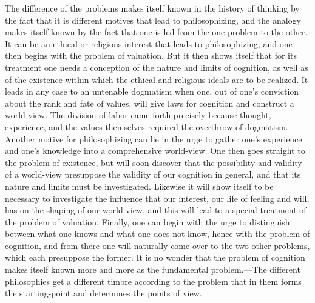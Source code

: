 \documentclass[12pt,a4paper]{book}
\newcommand{\opage}[1]{\marginnote{\footnotesize\textit{[#1]}}}
\begin{document}
The difference of the problems makes itself known in the history of thinking
by the fact that it is different motives that lead to philosophizing, and the
analogy makes itself known by the fact that one is led from the one problem to
the other. It can be an ethical or religious interest that leads to
philosophizing, and one then begins with the problem of valuation. But it then
shows itself that for its treatment one needs a conception of the nature and
limits of cognition, as well as of the existence within which the ethical and
religious ideals are to be realized. It leads in any case to an untenable
dogmatism when one, out of one's conviction about the rank and fate of values,
will give laws for cognition and construct a world-view. The division of labor
came forth precisely because thought, experience, and the values themselves
required the overthrow of dogmatism. Another motive for philosophizing can lie
in the urge to gather one's experience and one's knowledge into a
comprehensive world-view. One then goes straight to the problem of existence,
but will soon discover that the possibility and validity of a world-view
presuppose the validity of our cognition in general, and that its nature and
limits must be investigated. Likewise it will show itself to be necessary to
investigate the influence that our interest, our life of feeling and will, has
on the shaping of our \opage{253}world-view, and this will lead to a special treatment of
the problem of valuation. Finally, one can begin with the urge to distinguish
between what one knows and what one does not know, hence with the problem of
cognition, and from there one will naturally come over to the two other
problems, which each presuppose the former. It is no wonder that the problem
of cognition makes itself known more and more as the fundamental
problem.---The different philosophies get a different timbre according to the
problem that in them forms the starting-point and determines the points of
view.
\end{document}
